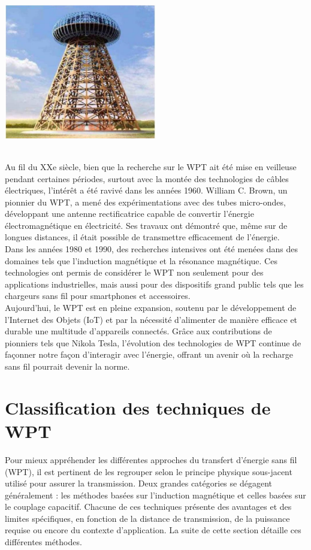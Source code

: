 \documentclass[12pt,a4paper,titlepage,notitlepage]{article}
\begin{document}
	\begin{center} \includegraphics[width=0.5\textwidth]{tour_tesla} \end{center} \ \\
	Au fil du XXe siècle, bien que la recherche sur le WPT ait été mise en veilleuse pendant certaines périodes, surtout avec la montée des technologies de câbles électriques, l'intérêt a été ravivé dans les années 1960. William C. Brown, un pionnier du WPT, a mené des expérimentations avec des tubes micro-ondes, développant une antenne rectificatrice capable de convertir l'énergie électromagnétique en électricité. Ses travaux ont démontré que, même sur de longues distances, il était possible de transmettre efficacement de l'énergie.\\
	
	Dans les années 1980 et 1990, des recherches intensives ont été menées dans des domaines tels que l'induction magnétique et la résonance magnétique. Ces technologies ont permis de considérer le WPT non seulement pour des applications industrielles, mais aussi pour des dispositifs grand public tels que les chargeurs sans fil pour smartphones et accessoires.\\
	
	Aujourd'hui, le WPT est en pleine expansion, soutenu par le développement de l'Internet des Objets (IoT) et par la nécessité d'alimenter de manière efficace et durable une multitude d'appareils connectés. Grâce aux contributions de pionniers tels que Nikola Tesla, l'évolution des technologies de WPT continue de façonner notre façon d'interagir avec l'énergie, offrant un avenir où la recharge sans fil pourrait devenir la norme.
	
	
	\newpage
	\section{Classification des techniques de WPT}
	
	Pour mieux appréhender les différentes approches du transfert d’énergie sans fil (WPT), il est pertinent de les regrouper selon le principe physique sous-jacent utilisé pour assurer la transmission. Deux grandes catégories se dégagent généralement : les méthodes basées sur l’induction magnétique et celles basées sur le couplage capacitif. Chacune de ces techniques présente des avantages et des limites spécifiques, en fonction de la distance de transmission, de la puissance requise ou encore du contexte d’application. La suite de cette section détaille ces différentes méthodes.
	
\end{document}
